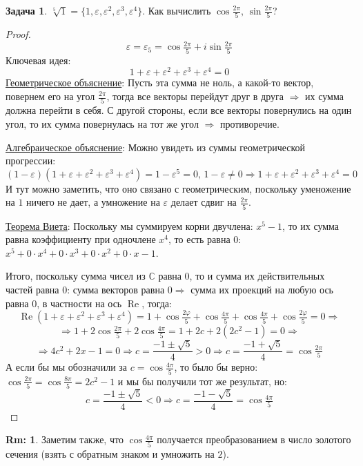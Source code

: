\documentclass[12pt]{article}
\newcommand{\MC}{\mathbb{C}}
\newcommand{\VE}{\varepsilon}
\theoremstyle{definition}
\newtheorem{rem}{Rm:}
\newtheorem{problem}{Задача}
\DeclareMathOperator{\RE}{\operatorname{Re}}
\begin{document}
\begin{problem}
	$\sqrt[5]{1} = \{1, \VE,\VE^2, \VE^3, \VE^4\}$. Как вычислить $\cos\tfrac{2\pi}{5}, \, \sin\tfrac{2\pi}{5}$?
\end{problem}
\begin{proof}
	$$
		\VE  = \VE_5 = \cos\tfrac{2\pi}{5} + i\sin\tfrac{2\pi}{5}
	$$
	Ключевая идея:
	$$
		1 + \VE + \VE^2 + \VE^3 + \VE^4 =0
	$$
	\uline{Геометрическое объяснение}: Пусть эта сумма не ноль, а какой-то вектор, повернем его на угол $\tfrac{2\pi}{5}$, тогда все векторы перейдут друг в друга $\Rightarrow$ их сумма должна перейти в себя. С другой стороны, если все векторы повернулись на один угол, то их сумма повернулась на тот же угол $\Rightarrow$ противоречие.
	
	\uline{Алгебраическое объяснение}: Можно увидеть из суммы геометрической прогрессии:
	$$
		(1 - \VE)(1 + \VE + \VE^2 + \VE^3 + \VE^4) = 1- \VE^5 = 0, \, 1 -\VE \neq 0 \Rightarrow 1 + \VE + \VE^2 + \VE^3 + \VE^4 = 0
	$$
	И тут можно заметить, что оно связано с геометрическим, поскольку уменожение на $1$ ничего не дает, а умножение на $\VE$ делает сдвиг на $\tfrac{2\pi}{5}$.
	
	\uline{Теорема Виета}: Поскольку мы суммируем корни двучлена: $x^5-1$, то их сумма равна коэффициенту при одночлене $x^4$, то есть равна $0$: $x^5 + 0{\cdot}x^4 + 0{\cdot}x^3 + 0{\cdot}x^2 + 0{\cdot}x - 1$.
	
	Итого, поскольку сумма чисел из $\MC$ равна $0$, то и сумма их действительных частей равна $0$: сумма векторов равна $0 \Rightarrow$ сумма их проекций на любую ось равна $0$, в частности на ось $\RE$, тогда:
	$$
		\RE(1 + \VE + \VE^2 + \VE^3 + \VE^4) = 1 + \cos\tfrac{2\varphi}{5} + \cos\tfrac{4\pi}{5} + \cos\tfrac{4\pi}{5}  + \cos\tfrac{2\varphi}{5} = 0 \Rightarrow 
	$$
	$$
		\Rightarrow 1 + 2\cos\tfrac{2\pi}{5} + 2\cos\tfrac{4\pi}{5} = 1 + 2c + 2(2c^2 - 1) = 0 \Rightarrow 
	$$
	$$
		\Rightarrow 4c^2 + 2x - 1 = 0\Rightarrow c = \dfrac{-1 \pm \sqrt{5}}{4} > 0 \Rightarrow c = \dfrac{-1 + \sqrt{5}}{4} = \cos\tfrac{2\pi}{5}
	$$
	А если бы мы обозначили за $c = \cos\tfrac{4\pi}{5}$, то было бы верно: $\cos\tfrac{2\pi}{5} = \cos\tfrac{8\pi}{5} = 2c^2 -1$ и мы бы получили тот же результат, но:
	$$
		c = \dfrac{-1 \pm \sqrt{5}}{4} < 0 \Rightarrow c = \dfrac{-1 - \sqrt{5}}{4} = \cos\tfrac{4\pi}{5}
	$$	
\end{proof}
\begin{rem}
	Заметим также, что $\cos\tfrac{4\pi}{5}$ получается преобразованием в число золотого сечения (взять с обратным знаком и умножить на $2$).
\end{rem}
\end{document}
